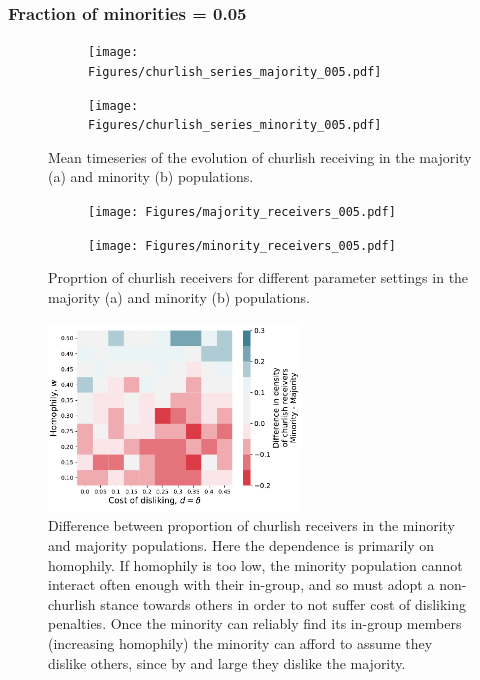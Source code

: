 \documentclass[11pt,letterpaper]{article}
\begin{document}
\subsubsection{Fraction of minorities = 0.05}

\begin{figure}[H]
  \centering
  \begin{subfigure}{0.49\textwidth}
    \centering
    \texttt{[image: Figures/churlish\_series\_majority\_005.pdf]}
    \caption{}
    \label{fig:}
  \end{subfigure}
  \begin{subfigure}{0.49\textwidth}
    \centering
    \texttt{[image: Figures/churlish\_series\_minority\_005.pdf]}
    \caption{}
    \label{fig:}
  \end{subfigure}
  \caption{Mean timeseries of the evolution of churlish receiving in the
    majority (a) and minority (b) populations.}
  \label{fig:regressions}
\end{figure}


\begin{figure}[H]
  \centering
  \begin{subfigure}{0.49\textwidth}
    \centering
    \texttt{[image: Figures/majority\_receivers\_005.pdf]}
    \caption{}
    \label{fig:}
  \end{subfigure}
  \begin{subfigure}{0.49\textwidth}
    \centering
    \texttt{[image: Figures/minority\_receivers\_005.pdf]}
    \caption{}
    \label{fig:}
  \end{subfigure}
  \caption{Proprtion of churlish receivers for different parameter settings in the
    majority (a) and minority (b) populations.}
  \label{fig:regressions}
\end{figure}

\begin{figure}[H]
  \centering
    \includegraphics[width=0.6\textwidth]{Figures/churlish_receivers_diff_005.pdf}
  \caption{Difference between proportion of churlish receivers in the minority 
    and majority populations. Here the dependence is primarily on homophily.
    If homophily is too low, the minority population cannot interact often
    enough with their in-group, and so must adopt a non-churlish stance towards
    others in order to not suffer cost of disliking penalties. Once the minority
    can reliably find its in-group members (increasing homophily) the minority
    can afford to assume they dislike others, since by and large they dislike
    the majority.
  }
  \label{fig:}
\end{figure}
\end{document}
